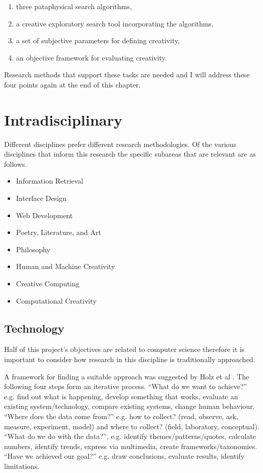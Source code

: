 \label{s:objectives}
\begin{enumerate}
  \item three pataphysical search algorithms,
  \item a creative exploratory search tool incorporating the algorithms,
  \item a set of subjective parameters for defining creativity,
  \item an objective framework for evaluating creativity.
\end{enumerate}

Research methods that support these tasks are needed and I will address these four points again at the end of this chapter.


\section{Intradisciplinary}

Different disciplines prefer different research methodologies. Of the various disciplines that inform this research the specific subareas that are relevant are as follows.

\begin{itemize}
  \item Information Retrieval
  \item Interface Design
  \item Web Development
  \item Poetry, Literature, and Art
  \item Philosophy
  \item Human and Machine Creativity
  \item Creative Computing
  \item Computational Creativity
\end{itemize}


\subsection{Technology}

Half of this project's objectives are related to computer science therefore it is important to consider how research in this discipline is traditionally approached.

A framework for finding a suitable approach was suggested by Holz et al \citeyear{Holz2006}. The following four steps form an iterative process. ``What do we want to achieve?'' e.g. find out what is happening, develop something that works, evaluate an existing system/technology, compare existing systems, change human behaviour. ``Where does the data come from?'' e.g. how to collect? (read, observe, ask, measure, experiment, model) and where to collect? (field, laboratory, conceptual). ``What do we do with the data?'', e.g. identify themes/patterns/quotes, calculate numbers, identify trends, express via multimedia, create frameworks/taxonomies. ``Have we achieved our goal?'' e.g. draw conclusions, evaluate results, identify limitations.

